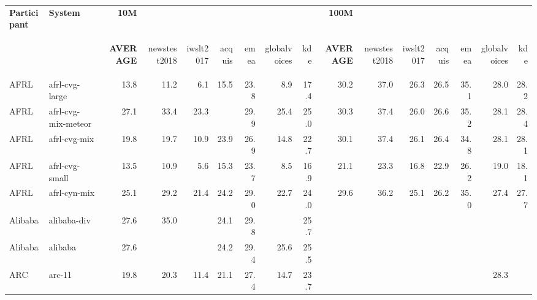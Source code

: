 \begin{table*}\small
\begin{center}
\setlength{\tabcolsep}{2pt}
\newcommand{\testSetTop}[1]{\begin{sideways}{\sc #1}\end{sideways} }
\begin{tabular}{|l|l|rrrrrrr|rrrrrrr|} \hline
\bf Participant & \bf System & \bf 10M &&&&&&& \bf 100M &&&&&&\\
&& \testSetTop{\bf AVERAGE} & \testSetTop{newstest2018} & \testSetTop{iwslt2017} & \testSetTop{acquis} & \testSetTop{emea} & \testSetTop{globalvoices} & \testSetTop{kde}& \testSetTop{\bf AVERAGE} & \testSetTop{newstest2018} & \testSetTop{iwslt2017} & \testSetTop{acquis} & \testSetTop{emea} & \testSetTop{globalvoices} & \testSetTop{kde}\\ \hline
AFRL & afrl-cvg-large & 13.8 & 11.2 & 6.1 & 15.5 & 23.8 & 8.9 & 17.4 & 30.2 & 37.0 & 26.3 & 26.5 & 35.1 & 28.0 & 28.2 \\ \hline
AFRL & afrl-cvg-mix-meteor & 27.1 & 33.4 & 23.3 & \cellcolor{green}{25.6} & 29.9 & 25.4 & 25.0 & 30.3 & 37.4 & 26.0 & 26.6 & 35.2 & 28.1 & 28.4 \\ \hline
AFRL & afrl-cvg-mix & 19.8 & 19.7 & 10.9 & 23.9 & 26.9 & 14.8 & 22.7 & 30.1 & 37.4 & 26.1 & 26.4 & 34.8 & 28.1 & 28.1 \\ \hline
AFRL & afrl-cvg-small & 13.5 & 10.9 & 5.6 & 15.3 & 23.7 & 8.5 & 16.9 & 21.1 & 23.3 & 16.8 & 22.9 & 26.2 & 19.0 & 18.1 \\ \hline
AFRL & afrl-cyn-mix & 25.1 & 29.2 & 21.4 & 24.2 & 29.0 & 22.7 & 24.0 & 29.6 & 36.2 & 25.1 & 26.2 & 35.0 & 27.4 & 27.7 \\ \hline
Alibaba & alibaba-div & 27.6 & 35.0 & \cellcolor{lightgreen}{25.2} & 24.1 & 29.8 & \cellcolor{lightyellow}{25.8} & 25.7 & \cellcolor{lightgreen}{31.9} & \cellcolor{lightgreen}{39.5} & \cellcolor{lightgreen}{27.1} & \cellcolor{green}{28.4} & \cellcolor{green}{36.7} & \cellcolor{lightgreen}{29.1} & \cellcolor{lightgreen}{30.7} \\ \hline
Alibaba & alibaba & 27.6 & \cellcolor{lightyellow}{35.2} & \cellcolor{green}{25.6} & 24.2 & 29.4 & 25.6 & 25.5 & \cellcolor{lightgreen}{31.9} & \cellcolor{lightgreen}{39.7} & \cellcolor{lightgreen}{27.3} & \cellcolor{green}{28.4} & \cellcolor{lightgreen}{36.4} & \cellcolor{lightgreen}{29.1} & \cellcolor{lightgreen}{30.6} \\ \hline
ARC & arc-11 & 19.8 & 20.3 & 11.4 & 21.1 & 27.4 & 14.7 & 23.7 & \cellcolor{lightyellow}{31.3} & \cellcolor{lightyellow}{39.0} & \cellcolor{lightyellow}{26.6} & \cellcolor{lightyellow}{27.8} & \cellcolor{lightyellow}{35.9} & 28.3 & \cellcolor{lightyellow}{30.4} \\ \hline

\end{tabular}
\end{center}
\end{table*}
